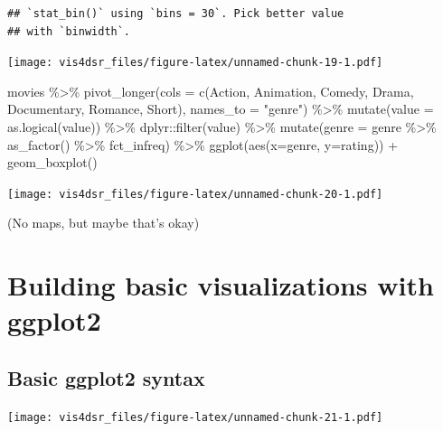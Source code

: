 \documentclass[
]{krantz}
\makeatletter
\newenvironment{Shaded}{\begin{snugshade}}{\end{snugshade}}
\newcommand{\AttributeTok}[1]{\textcolor[rgb]{0.61,0.61,0.61}{#1}}
\newcommand{\FunctionTok}[1]{\textcolor[rgb]{0,0,0}{#1}}
\newcommand{\NormalTok}[1]{#1}
\newcommand{\SpecialCharTok}[1]{\textcolor[rgb]{0,0,0}{#1}}
\newcommand{\StringTok}[1]{\textcolor[rgb]{0.5,0.5,0.5}{#1}}
\newenvironment{kframe}{%
\medskip{}
\setlength{\fboxsep}{.8em}
 \def\at@end@of@kframe{}%
 \ifinner\ifhmode%
  \def\at@end@of@kframe{\end{minipage}}%
  \begin{minipage}{\columnwidth}%
 \fi\fi%
 \def\FrameCommand##1{\hskip\@totalleftmargin \hskip-\fboxsep
 \colorbox{shadecolor}{##1}\hskip-\fboxsep
     \hskip-\linewidth \hskip-\@totalleftmargin \hskip\columnwidth}%
 \MakeFramed {\advance\hsize-\width
   \@totalleftmargin\z@ \linewidth\hsize
   \@setminipage}}%
 {\par\unskip\endMakeFramed%
 \at@end@of@kframe}
\renewenvironment{Shaded}{\begin{kframe}}{\end{kframe}}
\makeatother
\begin{document}
\begin{verbatim}
## `stat_bin()` using `bins = 30`. Pick better value
## with `binwidth`.
\end{verbatim}

\texttt{[image: vis4dsr\_files/figure-latex/unnamed-chunk-19-1.pdf]}

\begin{Shaded}
\begin{Highlighting}[]
\NormalTok{movies }\SpecialCharTok{\%\textgreater{}\%} 
  \FunctionTok{pivot\_longer}\NormalTok{(}\AttributeTok{cols =} \FunctionTok{c}\NormalTok{(Action, Animation, Comedy, Drama, Documentary, Romance, Short), }\AttributeTok{names\_to =} \StringTok{"genre"}\NormalTok{) }\SpecialCharTok{\%\textgreater{}\%}
  \FunctionTok{mutate}\NormalTok{(}\AttributeTok{value =} \FunctionTok{as.logical}\NormalTok{(value)) }\SpecialCharTok{\%\textgreater{}\%}
\NormalTok{  dplyr}\SpecialCharTok{::}\FunctionTok{filter}\NormalTok{(value) }\SpecialCharTok{\%\textgreater{}\%}
  \FunctionTok{mutate}\NormalTok{(}\AttributeTok{genre =}\NormalTok{ genre }\SpecialCharTok{\%\textgreater{}\%}
           \FunctionTok{as\_factor}\NormalTok{() }\SpecialCharTok{\%\textgreater{}\%}
\NormalTok{           fct\_infreq) }\SpecialCharTok{\%\textgreater{}\%}
  \FunctionTok{ggplot}\NormalTok{(}\FunctionTok{aes}\NormalTok{(}\AttributeTok{x=}\NormalTok{genre, }\AttributeTok{y=}\NormalTok{rating)) }\SpecialCharTok{+}
    \FunctionTok{geom\_boxplot}\NormalTok{()}
\end{Highlighting}
\end{Shaded}

\texttt{[image: vis4dsr\_files/figure-latex/unnamed-chunk-20-1.pdf]}

(No maps, but maybe that's okay)

\hypertarget{building-basic-visualizations}{%
\chapter{Building basic visualizations with ggplot2}\label{building-basic-visualizations}}

\hypertarget{basic-ggplot2-syntax}{%
\section{Basic ggplot2 syntax}\label{basic-ggplot2-syntax}}

\texttt{[image: vis4dsr\_files/figure-latex/unnamed-chunk-21-1.pdf]}
\end{document}
